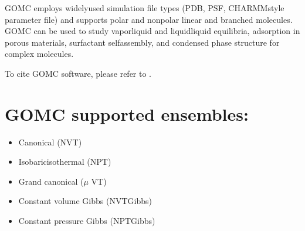 \documentclass[letterpaper,10pt,english]{sphinxmanual}
\begin{document}
GOMC employs widely\sphinxhyphen{}used simulation file types (PDB, PSF, CHARMM\sphinxhyphen{}style parameter file) and supports polar and non\sphinxhyphen{}polar linear and branched molecules. GOMC can be used to study vapor\sphinxhyphen{}liquid and liquid\sphinxhyphen{}liquid equilibria, adsorption in porous materials, surfactant self\sphinxhyphen{}assembly, and condensed phase structure for complex molecules.

To cite GOMC software, please refer to .


\section{GOMC supported ensembles:}
\label{\detokenize{introduction:gomc-supported-ensembles}}\begin{itemize}
\item {} 
Canonical (NVT)

\item {} 
Isobaric\sphinxhyphen{}isothermal (NPT)

\item {} 
Grand canonical (\(\mu\) VT)

\item {} 
Constant volume Gibbs (NVT\sphinxhyphen{}Gibbs)

\item {} 
Constant pressure Gibbs (NPT\sphinxhyphen{}Gibbs)

\end{itemize}
\end{document}
